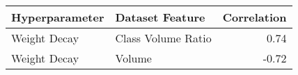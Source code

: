 \begin{tabular}{llr}
\toprule
Hyperparameter & Dataset Feature & Correlation \\
\midrule
Weight Decay & Class Volume Ratio & 0.74 \\
Weight Decay & Volume & -0.72 \\
\bottomrule
\end{tabular}
